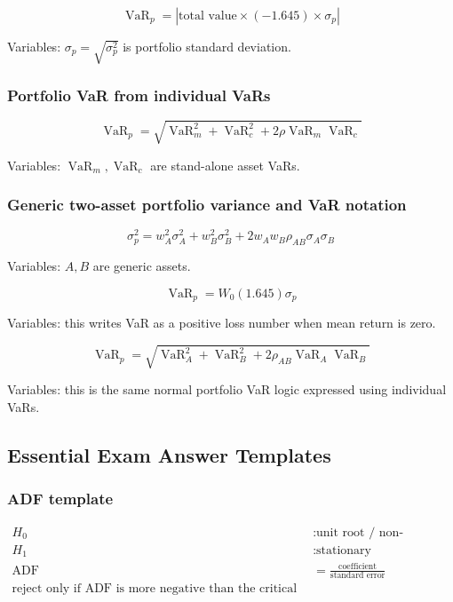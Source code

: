 \documentclass[
  8pt,
  twocolumn]{extarticle}
\begin{document}
\[
\operatorname{VaR}_p=\left|\text{total value}\times(-1.645)\times\sigma_p\right|
\]

Variables: \(\sigma_p=\sqrt{\sigma_p^2}\) is portfolio standard
deviation.

\subsubsection{Portfolio VaR from individual
VaRs}\label{portfolio-var-from-individual-vars}

\[
\operatorname{VaR}_p=\sqrt{\operatorname{VaR}_m^2+\operatorname{VaR}_c^2+2\rho\operatorname{VaR}_m\operatorname{VaR}_c}
\]

Variables: \(\operatorname{VaR}_m,\operatorname{VaR}_c\) are stand-alone
asset VaRs.

\subsubsection{Generic two-asset portfolio variance and VaR
notation}\label{generic-two-asset-portfolio-variance-and-var-notation}

\[
\sigma_p^2=w_A^2\sigma_A^2+w_B^2\sigma_B^2+2w_Aw_B\rho_{AB}\sigma_A\sigma_B
\]

Variables: \(A,B\) are generic assets.

\[
\operatorname{VaR}_p=W_0(1.645)\sigma_p
\]

Variables: this writes VaR as a positive loss number when mean return is
zero.

\[
\operatorname{VaR}_p=\sqrt{\operatorname{VaR}_A^2+\operatorname{VaR}_B^2+2\rho_{AB}\operatorname{VaR}_A\operatorname{VaR}_B}
\]

Variables: this is the same normal portfolio VaR logic expressed using
individual VaRs.

\subsection{Essential Exam Answer
Templates}\label{essential-exam-answer-templates}

\subsubsection{ADF template}\label{adf-template}

\[
\begin{aligned}
H_0&:\text{unit root / non-stationary}\\
H_1&:\text{stationary}\\
\operatorname{ADF}&=\frac{\text{coefficient}}{\text{standard error}}\\
\text{reject only if ADF is more negative than the critical value}
\end{aligned}
\]
\end{document}
